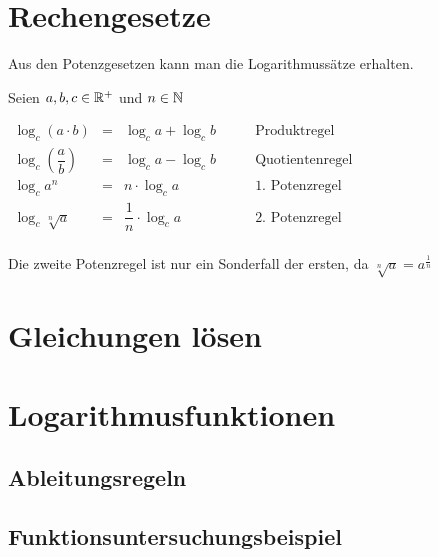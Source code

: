 			\section{Rechengesetze}

Aus den Potenzgesetzen kann man die Logarithmussätze erhalten.

\begin{Theorem}
Seien $a,b,c\in\mathbb{R}^+$ und $n\in\mathbb{N}$\\
\begin{center}
$\begin{array}{cccl}
\log_c(a\cdot b)&=&\log_ca+\log_cb&\qquad\mbox {Produktregel}\\
\log_c\left(\dfrac{a}{b}\right)&=&\log_ca-\log_cb&\qquad\mbox{Quotientenregel}\\
\log_ca^n&=&n\cdot\log_ca&\qquad\mbox{1. Potenzregel}\\
\log_c\sqrt[n]{a}&=&\dfrac{1}{n}\cdot\log_ca&\qquad\mbox{2. Potenzregel}\\
\end{array}$
\end{center}
\end{Theorem}

\begin{Bemerkung}
Die zweite Potenzregel ist nur ein Sonderfall der ersten, da $\sqrt[n]{a}=a^{\frac{1}{n}}$
\end{Bemerkung}

		\section{Gleichungen lösen}


		\section{Logarithmusfunktionen}

	\subsection{Ableitungsregeln}
	\subsection{Funktionsuntersuchungsbeispiel}
